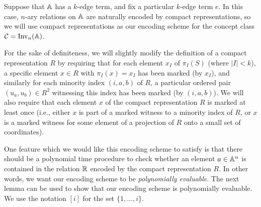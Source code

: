 \documentclass[letterpaper,11pt]{article}
\DeclareMathOperator{\Inv}{Inv}
\begin{document}
Suppose that $\mathbb{A}$ has a $k$-edge term, and fix a particular $k$-edge term $e$. In this case, $n$-ary relations on $\mathbb{A}$ are naturally encoded by compact representations, so we will use compact representations as our encoding scheme for the concept class $\cC = \Inv_n(\bA)$.

For the sake of definiteness, we will slightly modify the definition of a compact representation $R$ by requiring that for each element $x_I$ of $\pi_I(S)$ (where $|I| < k$), a specific element $x \in R$ with $\pi_I(x) = x_I$ has been marked (by $x_I$), and similarly for each minority index $(i,a,b)$ of $R$, a particular ordered pair $(u_a,u_b) \in R^2$ witnessing this index has been marked (by $(i,a,b)$). We will also require that each element $x$ of the compact representation $R$ is marked at least once (i.e., either $x$ is part of a marked witness to a minority index of $R$, or $x$ is a marked witness for some element of a projection of $R$ onto a small set of coordinates).

One feature which we would like this encoding scheme to satisfy is that there should be a polynomial time procedure to check whether an element $a \in \mathbb{A}^n$ is contained in the relation $\mathbb{R}$ encoded by the compact representation $R$. In other words, we want our encoding scheme to be \emph{polynomially evaluable}. The next lemma can be used to show that our encoding scheme is polynomially evaluable. We use the notation $[i]$ for the set $\{1, ..., i\}$.
\end{document}
